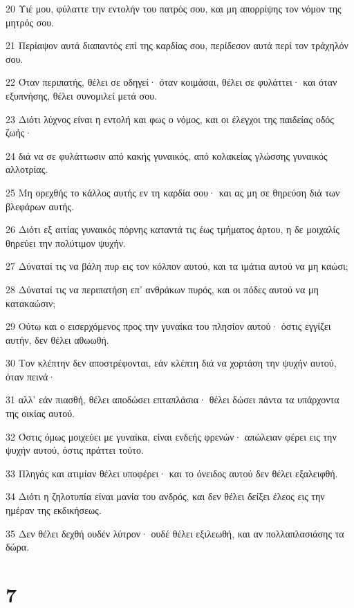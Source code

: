 \par 20 Υιέ μου, φύλαττε την εντολήν του πατρός σου, και μη απορρίψης τον νόμον της μητρός σου.
\par 21 Περίαψον αυτά διαπαντός επί της καρδίας σου, περίδεσον αυτά περί τον τράχηλόν σου.
\par 22 Όταν περιπατής, θέλει σε οδηγεί· όταν κοιμάσαι, θέλει σε φυλάττει· και όταν εξυπνήσης, θέλει συνομιλεί μετά σου.
\par 23 Διότι λύχνος είναι η εντολή και φως ο νόμος, και οι έλεγχοι της παιδείας οδός ζωής·
\par 24 διά να σε φυλάττωσιν από κακής γυναικός, από κολακείας γλώσσης γυναικός αλλοτρίας.
\par 25 Μη ορεχθής το κάλλος αυτής εν τη καρδία σου· και ας μη σε θηρεύση διά των βλεφάρων αυτής.
\par 26 Διότι εξ αιτίας γυναικός πόρνης καταντά τις έως τμήματος άρτου, η δε μοιχαλίς θηρεύει την πολύτιμον ψυχήν.
\par 27 Δύναταί τις να βάλη πυρ εις τον κόλπον αυτού, και τα ιμάτια αυτού να μη καώσι;
\par 28 Δύναταί τις να περιπατήση επ' ανθράκων πυρός, και οι πόδες αυτού να μη κατακαώσιν;
\par 29 Ούτω και ο εισερχόμενος προς την γυναίκα του πλησίον αυτού· όστις εγγίζει αυτήν, δεν θέλει αθωωθή.
\par 30 Τον κλέπτην δεν αποστρέφονται, εάν κλέπτη διά να χορτάση την ψυχήν αυτού, όταν πεινά·
\par 31 αλλ' εάν πιασθή, θέλει αποδώσει επταπλάσια· θέλει δώσει πάντα τα υπάρχοντα της οικίας αυτού.
\par 32 Όστις όμως μοιχεύει με γυναίκα, είναι ενδεής φρενών· απώλειαν φέρει εις την ψυχήν αυτού, όστις πράττει τούτο.
\par 33 Πληγάς και ατιμίαν θέλει υποφέρει· και το όνειδος αυτού δεν θέλει εξαλειφθή.
\par 34 Διότι η ζηλοτυπία είναι μανία του ανδρός, και δεν θέλει δείξει έλεος εις την ημέραν της εκδικήσεως.
\par 35 Δεν θέλει δεχθή ουδέν λύτρον· ουδέ θέλει εξιλεωθή, και αν πολλαπλασιάσης τα δώρα.

\chapter{7}

